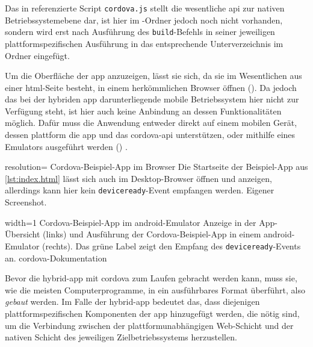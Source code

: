 {Das in  referenzierte Script \lstinline|cordova.js| stellt die \og wesentliche \gls{api} zur nativen Betriebssystemebene dar, ist hier im -Ordner jedoch noch nicht vorhanden, sondern wird erst nach Ausführung des \lstinline|build|-Befehls in seiner jeweiligen plattformspezifischen Ausführung in das entsprechende Unterverzeichnis im Ordner  eingefügt. 



Um die Oberfläche der \gls{app} anzuzeigen, lässt sie sich, da sie im Wesentlichen aus einer \gls{html}-Seite besteht, in einem herkömmlichen Browser öffnen ().
Da jedoch das bei der hybriden \gls{app} darunterliegende mobile Betriebssystem hier nicht zur Verfügung steht, ist hier auch keine Anbindung an dessen Funktionalitäten möglich.
Dafür muss die Anwendung entweder direkt auf einem mobilen Gerät, dessen \gls{plattform} die \gls{app} und das \gls{cordova}-\gls{api} unterstützen, oder mithilfe eines Emulators ausgeführt werden () \cite{Cordova-Docs_CLI}.

	{resolution=\screenshotRes}
	{Cordova-Beispiel-App im Browser}
		{Die Startseite der Beispiel-App aus \autoref{lst:index.html} lässt sich auch im Desktop-Browser öffnen und anzeigen, allerdings kann hier kein \lstinline|deviceready|-Event empfangen werden.}
	{Eigener Screenshot.}

	{width=1\textwidth}
	{Cordova-Beispiel-App im \gls{android}-Emulator}
		{Anzeige in der App-Übersicht (links) und Ausführung der Cordova-Beispiel-App in einem \gls{android}-Emulator (rechts). Das grüne Label zeigt den Empfang des \lstinline|deviceready|-Events an.}
	{\gls{cordova}-Dokumentation \cite{android_emulate_install.png}}

Bevor die \gls{hybrid-app} mit \gls{cordova} zum Laufen gebracht werden kann, muss sie, wie die meisten Computerprogramme, in ein ausführbares Format überführt, also \emph{gebaut} werden.
Im Falle der \gls{hybrid-app} bedeutet das, dass diejenigen plattformspezifischen Komponenten der \gls{app} hinzugefügt werden, die nötig sind, um die Verbindung zwischen der plattformunabhängigen Web-Schicht und der nativen Schicht des jeweiligen Zielbetriebssystems herzustellen.

}
